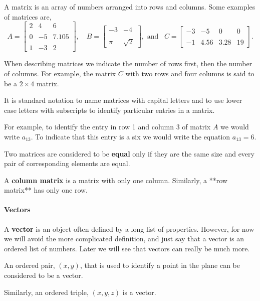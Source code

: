 A matrix is an array of numbers arranged into rows and columns. Some
examples of matrices are,
$$A=
\begin{bmatrix}
2 & 4 & 6 \\\\ 0 & -5 & 7.105\\\\ 1 & -3 & 2
\end{bmatrix}
,\quad
B=
\begin{bmatrix}
    -3 & -4 \\\\ \pi & \sqrt{2}
\end{bmatrix}
,\textrm{ and }\,\,\,
C=
\begin{bmatrix}
    -3 & -5 & 0 & 0 \\\\ -1 & 4.56 & 3.28 & 19
\end{bmatrix}
.$$

When describing matrices we indicate the number of rows first, then the
number of columns. For example, the matrix $C$ with two rows and four
columns is said to be a $2\times 4$ matrix.

It is standard notation to name matrices with capital letters and to use
lower case letters with subscripts to identify particular entries in a
matrix.

For example, to identify the entry in row 1 and column 3 of matrix $A$
we would write $a_{13}$. To indicate that this entry is a six we would
write the equation $a_{13}=6$.

Two matrices are considered to be \textbf{equal} only if they are the same
size and every pair of corresponding elements are equal.

A \textbf{column matrix} is a matrix with only one column. Similarly, a **row
matrix** has only one row.

\paragraph{Vectors}

A \textbf{vector} is an object often defined by a long list of properties.
However, for now we will avoid the more complicated definition, and just
say that a vector is an ordered list of numbers. Later we will see that
vectors can really be much more.

An ordered pair, $(x, y)$, that is used to identify a point in the plane
can be considered to be a vector.

Similarly, an ordered triple, $(x, y, z)$ is a vector.

